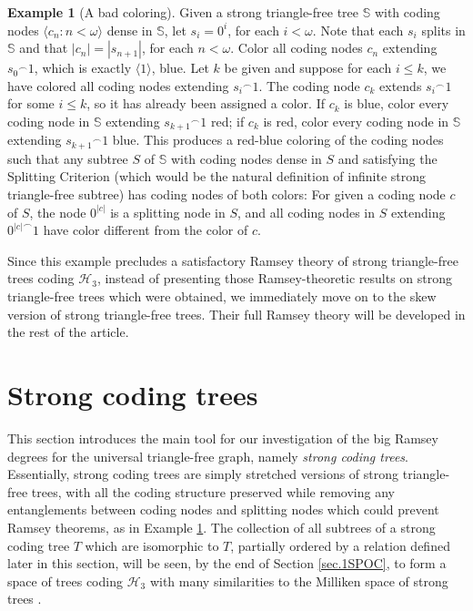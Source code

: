 \documentclass{amsart}
\theoremstyle{remark}
\theoremstyle{definition}
\newtheorem{example}[thm]{Example}
\theoremstyle{remark}
\newcommand{\om}{\omega}
\newcommand{\bS}{\mathbb{S}}
\newcommand{\lgl}{\langle}
\newcommand{\rgl}{\rangle}
\begin{document}
\begin{example}[A bad coloring]\label{ex.bc}
Given a strong triangle-free tree $\bS$ with coding nodes $\lgl c_n:n<\om\rgl$ dense in $\bS$,
let
$s_i=0^{i}$, for each $i<\om$.
Note that each $s_i$ splits in $\bS$ and  that
 $|c_n|=|s_{n+1}|$, for each $n<\om$.
Color all coding nodes $c_n$ extending  ${s_0}^{\frown}1$, which is exactly $\lgl 1\rgl$,   blue.
Let $k$ be given and suppose
for each $i\le k$,
we have colored all coding nodes extending ${s_i}^{\frown}1$.
 The coding node $c_k$  extends ${s_i}^{\frown}1$ for some $i\le k$, so it has already been assigned a color.
If $c_k$ is blue, color every coding node in $\bS$ extending ${s_{k+1}}^{\frown}1$ red;
if $c_k$ is red, color every coding node in $\bS$ extending ${s_{k+1}}^{\frown}1$ blue.
This produces a red-blue coloring of the coding nodes  such that
any  subtree $S$  of $\bS$ with coding nodes dense in $S$  and satisfying the Splitting Criterion (which would be the natural definition  of  infinite strong triangle-free subtree) has coding nodes of both colors:
For given a coding node $c$  of $S$, the node $0^{|c|}$ is a splitting node in $S$,
and all coding nodes in $S$ extending  ${0^{|c|}}^{\frown}1$ have color different from the color of $c$.
\end{example}


Since this example precludes a satisfactory  Ramsey theory of strong triangle-free trees coding $\mathcal{H}_3$,
 instead of  presenting those  Ramsey-theoretic results on strong triangle-free trees which were obtained,
we immediately move on to
  the skew version of strong triangle-free trees.
Their full Ramsey theory will be developed in the rest of the article.




\section{Strong coding trees}\label{sec.4}




This section introduces the main tool for  our investigation of the big Ramsey degrees for the universal triangle-free graph, namely {\em strong coding trees}.
Essentially,  strong coding trees are simply stretched versions of strong triangle-free trees, with
all the coding structure  preserved while
removing  any
 entanglements  between coding nodes and splitting nodes
 which could prevent Ramsey theorems, as in  Example \ref{ex.bc}.
The collection of all subtrees of a strong coding tree $T$ which are isomorphic to $T$, partially ordered by a relation
defined later in this section,
will be seen, by the end of Section \ref{sec.1SPOC},
to
  form a space of trees coding $\mathcal{H}_3$
with many  similarities to  the Milliken space of strong trees \cite{Milliken79}.
\end{document}
